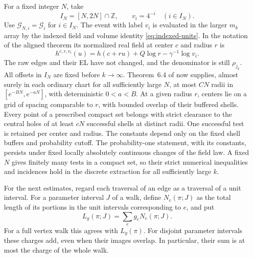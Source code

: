 For a fixed integer \(N\), take
\[
 I_N=[N,2N]\cap\mathbb Z,\qquad v_i=4^{-i}\quad(i\in I_N).
\]
Use \(\mathcal G_{N,i}=\mathcal G_i\) for \(i\in I_N\).  The event with
label \(v_i\) is evaluated in the larger \(m_k\) array by
the indexed field and volume identity \eqref{eq:indexed-units}.  In the
notation of the aligned theorem its normalized real field at center \(c\)
and radius \(r\) is
\begin{equation}\label{eq:aligned-unit-field}
 h^{c,r,v_i}(u)
   =h(c+ru)+Q\log r-\gamma^{-1}\log v_i .
\end{equation}
The raw edges and their EL have not changed, and the denominator is still
\(\rho_{j_k}\).  All offsets in \(I_N\) are fixed before \(k\to\infty\).
Theorem~6.4 of \cite{C} now supplies, almost surely in each ordinary chart
for all sufficiently large \(N\), at most \(CN\) radii in
\([e^{-BN},e^{-aN}]\), with deterministic \(0<a<B\).  At a given radius
\(r\), centers lie on a grid of spacing comparable to \(r\), with bounded
overlap of their buffered shells.  Every point of a prescribed compact
set belongs with strict clearance to the central holes of at least \(cN\)
successful shells at distinct radii.  One successful test is retained per
center and radius.  The constants depend only on the fixed shell buffers
and probability cutoff.  The probability-one statement, with its constants,
persists under fixed locally absolutely continuous changes of the field
law.  A fixed \(N\) gives finitely many tests in a compact set, so their
strict numerical inequalities and incidences hold in the discrete
extraction for all sufficiently large \(k\).

For the next estimates, regard each traversal of an edge as a traversal
of a unit interval.  For a parameter interval \(J\) of a walk, define
\(N_e(\pi;J)\) as the total length of its portions in the unit intervals
corresponding to \(e\), and put
\[
 L_g(\pi;J)=\sum_e g_eN_e(\pi;J).
\]
For a full vertex walk this agrees with \(L_g(\pi)\).  For disjoint
parameter intervals these charges add, even when their images overlap.
In particular, their sum is at most the charge of the whole walk.

